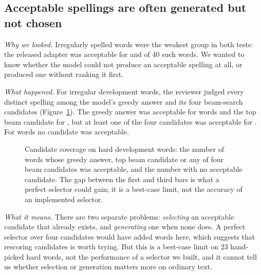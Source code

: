 \documentclass[10pt,a4paper,twocolumn]{article}
\begin{document}
\subsection{Acceptable spellings are often generated but not chosen}
\label{sec:res-rank}
\emph{Why we looked.} Irregularly spelled words were the weakest group in both tests: the released adapter was
acceptable for  and  of 40 such words. We wanted to know whether the
model could not produce an acceptable spelling at all, or produced one without ranking it first.

\emph{What happened.} For  irregular development words, the reviewer judged every distinct spelling
among the model's greedy answer and its four beam-search candidates (Figure~\ref{fig:coverage}). The greedy answer was
acceptable for  words and the top beam candidate for , but at least one of the four
candidates was acceptable for . For  words no candidate was acceptable.

\begin{figure}[t]
\centering
{}
\caption{Candidate coverage on  hard development words: the number of words whose greedy answer, top
beam candidate or any of four beam candidates was acceptable, and the number with no acceptable candidate. The gap
between the first and third bars is what a perfect selector could gain; it is a best-case limit, not the accuracy
of an implemented selector.}
\label{fig:coverage}
\end{figure}

\emph{What it means.} There are two separate problems: \emph{selecting} an acceptable candidate that already exists,
and \emph{generating} one when none does. A perfect selector over four candidates would have added
 words here, which suggests that rescoring candidates \citep{grundkiewicz-heafield-2018-neural}
is worth trying. But this is a best-case limit on 23 hand-picked hard words, not the performance of a selector we
built, and it cannot tell us whether selection or generation matters more on ordinary text.
\end{document}
